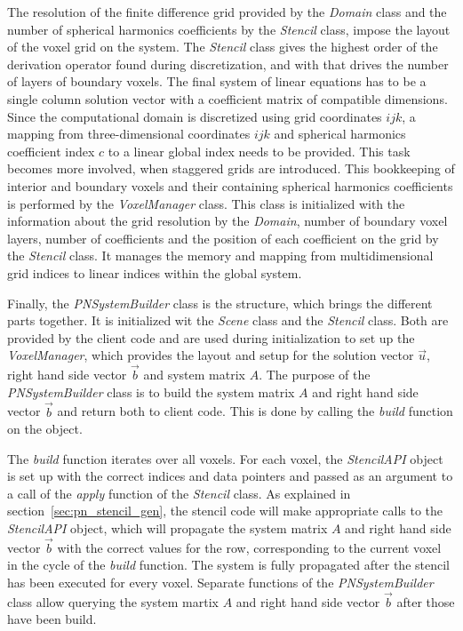 The resolution of the finite difference grid provided by the \emph{Domain} class and the number of spherical harmonics coefficients by the \emph{Stencil} class, impose the layout of the voxel grid on the system. The \emph{Stencil} class gives the highest order of the derivation operator found during discretization, and with that drives the number of layers of boundary voxels. The final system of linear equations has to be a single column solution vector with a coefficient matrix of compatible dimensions. Since the computational domain is discretized using grid coordinates $ijk$, a mapping from three-dimensional coordinates $ijk$ and spherical harmonics coefficient index $c$ to a linear global index needs to be provided. This task becomes more involved, when staggered grids are introduced. This bookkeeping of interior and boundary voxels and their containing spherical harmonics coefficients is performed by the \emph{VoxelManager} class. This class is initialized with the information about the grid resolution by the \emph{Domain}, number of boundary voxel layers, number of coefficients and the position of each coefficient on the grid by the \emph{Stencil} class. It manages the memory and mapping from multidimensional grid indices to linear indices within the global system.

Finally, the \emph{PNSystemBuilder} class is the structure, which brings the different parts together. It is initialized wit the \emph{Scene} class and the \emph{Stencil} class. Both are provided by the client code and are used during initialization to set up the \emph{VoxelManager}, which provides the layout and setup for the solution vector $\vec{u}$, right hand side vector $\vec{b}$ and system matrix $A$. The purpose of the \emph{PNSystemBuilder} class is to build the system matrix $A$ and right hand side vector $\vec{b}$ and return both to client code. This is done by calling the \emph{build} function on the object.

The \emph{build} function iterates over all voxels. For each voxel, the \emph{StencilAPI} object is set up with the correct indices and data pointers and passed as an argument to a call of the \emph{apply} function of the \emph{Stencil} class. As explained in section~\ref{sec:pn_stencil_gen}, the stencil code will make appropriate calls to the \emph{StencilAPI} object, which will propagate the system matrix $A$ and right hand side vector $\vec{b}$ with the correct values for the row, corresponding to the current voxel in the cycle of the \emph{build} function. The system is fully propagated after the stencil has been executed for every voxel. Separate functions of the \emph{PNSystemBuilder} class allow querying the system martix $A$ and right hand side vector $\vec{b}$ after those have been build.

